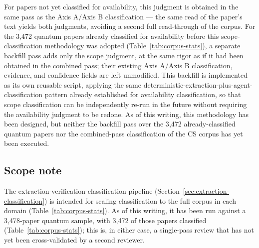 For papers not yet classified for availability, this judgment is obtained in the same
pass as the Axis A/Axis B classification --- the same read of the paper's text yields
both judgments, avoiding a second full read-through of the corpus. For the 3{,}472
quantum papers already classified for availability before this scope-classification
methodology was adopted (Table~\ref{tab:corpus-stats}), a separate backfill pass adds
only the scope judgment, at the same rigor as if it had been obtained in the combined
pass; their existing Axis A/Axis B classification, evidence, and confidence fields are
left unmodified. This backfill is implemented as its own reusable script, applying the
same deterministic-extraction-plus-agent-classification pattern already established
for availability classification, so that scope classification can be independently
re-run in the future without requiring the availability judgment to be redone. As of
this writing, this methodology has been designed, but neither the backfill pass over
the 3{,}472 already-classified quantum papers nor the combined-pass classification of
the CS corpus has yet been executed.

\subsection{Scope note}
The extraction-verification-classification pipeline (Section~\ref{sec:extraction-classification})
is intended for scaling classification to the full corpus in each domain
(Table~\ref{tab:corpus-stats}). As of this writing, it has been run against a
3{,}478-paper quantum sample, with 3{,}472 of those papers classified
(Table~\ref{tab:corpus-stats}); this is, in either case, a single-pass review that has
not yet been cross-validated by a second reviewer.
